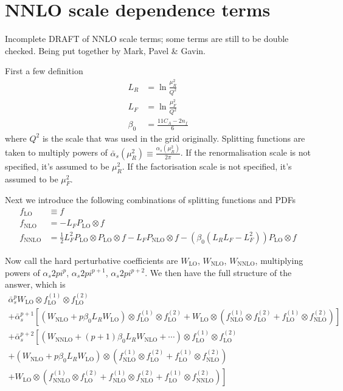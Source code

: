 \documentclass[12pt]{article}
\newcommand{\as}{\alpha_s}
\newcommand{\asbar}{{\bar \alpha}_s}
\newcommand{\LO}{\text{LO}}
\newcommand{\NLO}{\text{NLO}}
\newcommand{\NNLO}{\text{NNLO}}
\begin{document}
\section*{NNLO scale dependence terms}

Incomplete DRAFT of NNLO scale terms; some terms are still to be
double checked. Being put together by Mark, Pavel \& Gavin.

First a few definition
\begin{align}
  \label{eq:defs}
  L_R &= \ln \frac{\mu_R^2}{Q^2}\\
  L_F &= \ln \frac{\mu_F^2}{Q^2}\\
  \beta_0 &= \frac{11C_A - 2 n_f}{6}
\end{align}
where $Q^2$ is the scale that was used in the grid originally.
%
Splitting functions are taken to multiply powers of $\asbar(\mu_R^2) \equiv
\frac{\as(\mu_R^2)}{2\pi}$. 
%
If the renormalisation scale is not specified, it's assumed to be
$\mu_R^2$. 
%
If the factorisation scale is not specified, it's assumed to be
$\mu_F^2$. 

Next we introduce the following combinations of splitting functions
and PDFs
\begin{align}
  f_\LO   &\equiv f\\
  f_\NLO  &= - L_F P_\LO \otimes f\\
  f_\NNLO &=  \frac12 L_F^2 P_\LO \otimes P_\LO \otimes f
             - L_F P_\NLO \otimes f
             - (\beta_0(L_R L_F - L_F^2)) P_\LO \otimes f
\end{align}

Now call the hard perturbative coefficients are $W_\LO$,
$W_\NLO$, $W_\NNLO$,  multiplying powers of $\as2pi^p$,
$\as2pi^{p+1}$, $\as2pi^{p+2}$.
%
We then have the full structure of the answer, which is
\begin{multline}
  \asbar^p W_\LO \otimes f_\LO^{(1)} \otimes f_\LO^{(2)}
  \\
  + \asbar^{p+1} \left[ 
    (W_\NLO + p \beta_0 L_R W_\LO) \otimes f_\LO^{(1)}  \otimes f_\LO^{(2)}
    + W_\LO \otimes (f_\NLO^{(1)}\otimes f_\LO^{(2)} + f_\LO^{(1)}\otimes f_\NLO^{(2)})
  \right]
  \\
  + \asbar^{p+2} \left[ 
    (W_\NNLO + (p+1) \beta_0 L_R W_\NLO + \cdots) \otimes f_\LO^{(1)}
    \otimes f_\LO^{(2)}\right.
  \\
    + (W_\NLO + p \beta_0 L_R W_\LO) \otimes (f_\NLO^{(1)}\otimes f_\LO^{(2)}  + f_\LO^{(1)}\otimes f_\NLO^{(2)})
    \\
    \left.
    + W_\LO  \otimes (f_\NNLO^{(1)}\otimes f_\LO^{(2)}  +
    f_\NLO^{(1)}\otimes f_\NLO^{(2)} + f_\LO^{(1)}\otimes f_\NNLO^{(2)})
  \right]
\end{multline}
\end{document}
